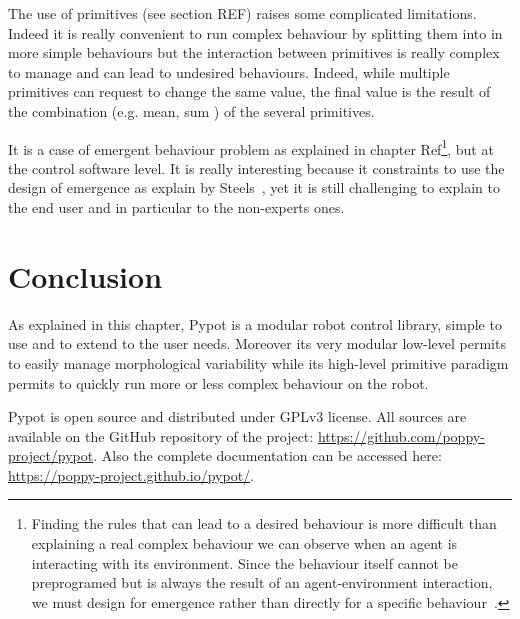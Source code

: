 The use of primitives (see section REF) raises some complicated limitations. Indeed it is really convenient to run complex behaviour by splitting them into in more simple behaviours but the interaction between primitives is really complex to manage and can lead to undesired behaviours. Indeed, while multiple primitives can request to change the same value, the final value is the result of the combination (e.g. mean, sum ) of the several primitives.

It is a case of emergent behaviour problem as explained in chapter Ref\footnote{Finding the rules that can lead to a desired behaviour is more difficult than explaining a real complex behaviour we can observe when an agent is interacting with its environment. Since the behaviour itself cannot be preprogramed but is always the result of an agent-environment interaction, we must design for emergence rather than directly for a specific behaviour~\parencite{Pfeifer06}.}, but at the control software level. It is really interesting because it constraints to use the design of emergence as explain by Steels~\parencite{Steels1991emergence}, yet it is still challenging to explain to the end user and in particular to the non-experts ones.


\section{Conclusion} %

As explained in this chapter, Pypot is a modular robot control library, simple to use and to extend to the user needs. Moreover its very modular low-level permits to easily manage morphological variability while its high-level primitive paradigm permits to quickly run more or less complex behaviour on the robot.

Pypot is open source and distributed under GPLv3 license. All sources are available on the GitHub repository of the project: \url{https://github.com/poppy-project/pypot}. Also the complete documentation can be accessed here: \url{https://poppy-project.github.io/pypot/}.





% 


